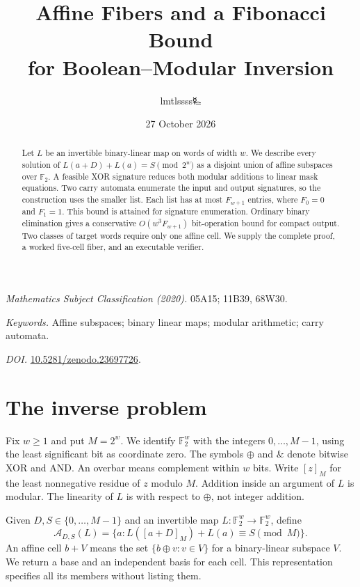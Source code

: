 \documentclass[11pt,a4paper]{article}
\title{\LARGE Affine Fibers and a Fibonacci Bound\\for Boolean--Modular Inversion}
\author{lmtlssss{\authorsymbol 🜐}}
\date{27 October 2026}
\theoremstyle{definition}\newtheorem{definition}[theorem]{Definition}
\newcommand{\F}{\mathbb F_2}
\newcommand{\andb}{\mathbin{\&}}
\newcommand{\res}[1]{[#1]_M}
\begin{document}
\maketitle\thispagestyle{plain}
\begin{abstract}
Let $L$ be an invertible binary-linear map on words of width $w$.
We describe every solution of $L(a+D)+L(a)=S\pmod{2^w}$ as a disjoint
union of affine subspaces over $\F$. A feasible XOR signature reduces both
modular additions to linear mask equations. Two carry automata enumerate
the input and output signatures, so the construction uses the smaller
list. Each list has at most $F_{w+1}$ entries, where $F_0=0$ and $F_1=1$.
This bound is attained for signature enumeration. Ordinary binary
elimination gives a conservative $O(w^3F_{w+1})$ bit-operation bound for
compact output. Two classes of target words require only one affine
cell. We supply the complete proof, a worked five-cell fiber, and an
executable verifier.
\end{abstract}
\noindent\textit{Mathematics Subject Classification (2020).}
05A15; 11B39, 68W30.\par
\noindent\textit{Keywords.} Affine subspaces; binary linear maps;
modular arithmetic; carry automata.\par
\noindent\textit{DOI.} \href{https://doi.org/10.5281/zenodo.23697726}{10.5281/zenodo.23697726}.

\section{The inverse problem}
Fix $w\geq1$ and put $M=2^w$. We identify $\F^w$ with the integers
$0,\ldots,M-1$, using the least significant bit as coordinate zero.
The symbols $\oplus$ and $\andb$ denote bitwise XOR and AND. An overbar
means complement within $w$ bits. Write $\res z$ for the least nonnegative
residue of $z$ modulo $M$. Addition inside an argument of $L$ is modular.
The linearity of $L$ is with respect to $\oplus$, not integer addition.

Given $D,S\in\{0,\ldots,M-1\}$ and an invertible map
$L:\F^w\to\F^w$, define
\begin{equation}\label{eq:fiber}
\mathcal A_{D,S}(L)=\{a:L(\res{a+D})+L(a)\equiv S\pmod M\}.
\end{equation}
An affine cell $b+V$ means the set $\{b\oplus v:v\in V\}$ for a
binary-linear subspace $V$. We return a base and an independent basis
for each cell. This representation specifies all its members without
listing them.
\end{document}

